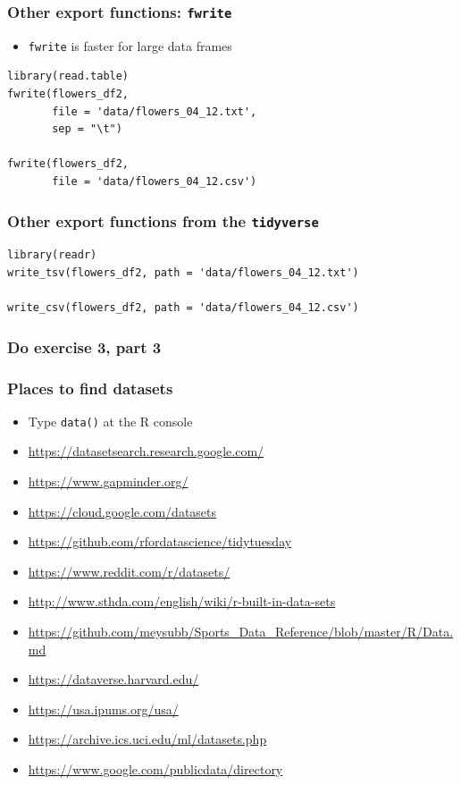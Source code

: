 \documentclass{beamer}
\newcommand{\bi}{\begin{itemize}}
\newcommand{\li}{\item}
\newcommand{\ei}{\end{itemize}}
\newcommand{\bfr}[1]{\begin{frame}[fragile]\frametitle{{ #1 }}}
\begin{document}
\bfr{Other export functions: {\tt fwrite}}
\bi
\li {\tt fwrite} is faster for large data frames
\ei
\begin{verbatim}
library(read.table)
fwrite(flowers_df2, 
       file = 'data/flowers_04_12.txt', 
       sep = "\t")

fwrite(flowers_df2, 
       file = 'data/flowers_04_12.csv')
\end{verbatim}
\end{frame}



\bfr{Other export functions from the {\tt tidyverse}}

\begin{verbatim}
library(readr)
write_tsv(flowers_df2, path = 'data/flowers_04_12.txt')

write_csv(flowers_df2, path = 'data/flowers_04_12.csv')
\end{verbatim}
\end{frame}



\bfr{Do exercise 3, part 3}
\end{frame}

\bfr{Places to find datasets}
\scriptsize
\bi
\li Type {\tt data()} at the R console
\li\url{https://datasetsearch.research.google.com/}
\li\url{https://www.gapminder.org/}
\li\url{https://cloud.google.com/datasets}
\li \url{https://github.com/rfordatascience/tidytuesday}
\li\url{https://www.reddit.com/r/datasets/}
\li\url{http://www.sthda.com/english/wiki/r-built-in-data-sets}
\li\url{https://github.com/meysubb/Sports_Data_Reference/blob/master/R/Data.md}
\li\url{https://dataverse.harvard.edu/}
\li\url{https://usa.ipums.org/usa/}
\li\url{https://archive.ics.uci.edu/ml/datasets.php}
\li\url{https://www.google.com/publicdata/directory}
\ei
\end{frame}
\end{document}
